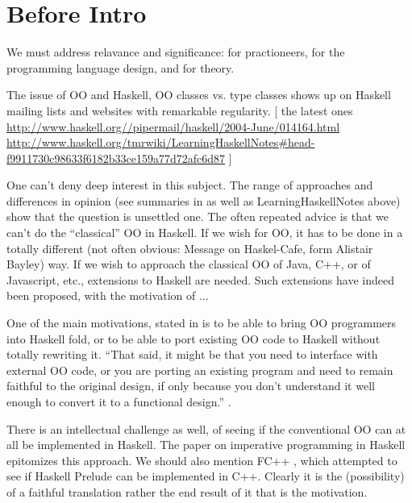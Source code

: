 \section{Before Intro}

We must address relavance and significance: for practioneers, for
the programming language design, and for theory.

The issue of OO and Haskell, OO classes vs. type classes shows up on
Haskell mailing lists and websites with remarkable regularity.
[
the latest ones
\url{http://www.haskell.org//pipermail/haskell/2004-June/014164.html}
\url{http://www.haskell.org/tmrwiki/LearningHaskellNotes#head-f9911730c98633f6182b33ce159a77d72afc6d87}
]

One can't deny deep interest in this subject. The range of approaches and
differences in opinion (see summaries in \cite{MonadReader3} as well as
LearningHaskellNotes above) show that the question is unsettled one.
The often repeated advice is that we can't do the ``classical'' OO in
Haskell. If we wish for OO, it has to be done in a totally different
(not often obvious: Message on Haskel-Cafe, form Alistair
Bayley) way. If we wish to approach the classical OO of Java, C++,
or of Javascript, etc., extensions to Haskell are needed. Such
extensions have indeed been proposed, with the motivation of ...

One of the main motivations, stated in \cite{MonadReader3} is to be able to
bring OO programmers into Haskell fold, or to be able to port existing
OO code to Haskell without totally rewriting it.  ``That said, it
might be that you need to interface with external OO code, or you are
porting an existing program and need to remain faithful to the
original design, if only because you don't understand it well enough
to convert it to a functional design.'' \cite{MonadReader3}.


There is an intellectual challenge as well, of seeing if the
conventional OO can at all be implemented in Haskell. The paper on
imperative programming in Haskell \cite{peytonjoneswadler-popl93}
epitomizes this approach. We should also mention FC++ \cite{fcpp-jfp},
which attempted to see if Haskell Prelude can be implemented in
C++. Clearly it is the (possibility) of a faithful translation rather the
end result of it that is the motivation.

